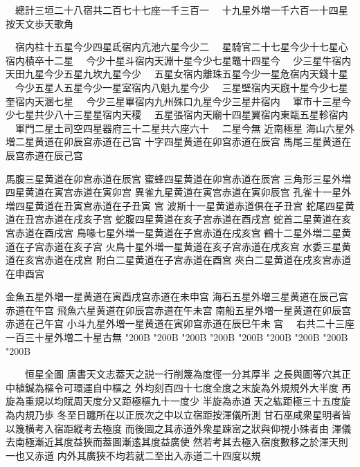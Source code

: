\begin{正文}
　總計三垣二十八宿共二百七十七座一千三百一
　十九星外増一千六百一十四星按天文歩天歌角
\par
　宿内柱十五星今少四星氐宿内亢池六星今少二
　星騎官二十七星今少十七星心宿内積卒十二星
　今少十星斗宿内天淵十星今少七星鼈十四星今
　少三星牛宿内天田九星今少五星九坎九星今少
　五星女宿内離珠五星今少一星危宿内天錢十星
　今少五星人五星今少一星室宿内八魁九星今少
　三星壁宿内天廐十星今少七星奎宿内天溷七星
　今少三星畢宿内九州殊口九星今少三星井宿内
　軍市十三星今少七星共少八十三星星宿内天稷
　五星張宿内天廟十四星翼宿内東甌五星軫宿内
　軍門二星土司空四星器府三十二星共六座六十
　二星今無
近南極星
海山六星外増二星黄道在卯辰宫赤道在己宫
十字四星黄道在卯宫赤道在辰宫
馬尾三星黄道在辰宫赤道在辰己宫
\par
馬腹三星黄道在卯宫赤道在辰宫
蜜蜂四星黄道在卯宫赤道在辰宫
三角形三星外増四星黄道在寅宫赤道在寅卯宫
異雀九星黄道在寅宫赤道在寅卯辰宫
孔雀十一星外増四星黄道在丑寅宫赤道在子丑寅
宫
波斯十一星黄道赤道俱在子丑宫
蛇尾四星黄道在丑宫赤道在戌亥子宫
蛇腹四星黄道在亥子宫赤道在酉戌宫
蛇首二星黄道在亥宫赤道在酉戌宫
鳥喙七星外増一星黄道在子宫赤道在戌亥宫
鶴十二星外増二星黄道在子宫赤道在亥子宫
火鳥十星外増一星黄道在亥子宫赤道在戌亥宫
水委三星黄道在亥宫赤道在戌宫
附白二星黄道在子宫赤道在酉宫
夾白二星黄道在戌亥宫赤道在申酉宫
\par
金魚五星外増一星黄道在寅酉戌宫赤道在未申宫
海石五星外増三星黄道在辰己宫赤道在午宫
飛魚六星黄道在卯辰宫赤道在午未宫
南船五星外増一星黄道在卯辰宫赤道在己午宫
小斗九星外増一星黄道在寅卯宫赤道在辰巳午未
宫
　右共二十三座一百三十星外増二十星古無
\char"200B\relax{}
\char"200B\relax{}
\char"200B\relax{}
\char"200B\relax{}
\char"200B\relax{}
\char"200B\relax{}
\char"200B\relax{}
\char"200B\relax{}
\char"200B\relax
\par
　　恒星全圖
唐書天文志葢天之説一行削篾為度徑一分其厚半
之長與圖等穴其正中植鍼為樞令可環運自中樞之
外均刻百四十七度全度之末旋為外規規外大半度
再旋為重規以均賦周天度分又距極樞九十一度少
半旋為赤道𢃄天之紘距極三十五度旋為内規乃歩
冬至日躔所在以正辰次之中以立宿距按渾儀所測
甘石巫咸衆星明者皆以篾横考入宿距縱考去極度
而後圖之其赤道外衆星踈宻之狀與仰視小殊者由
渾儀去南極漸近其度益狹而葢圖漸逺其度益廣使
然若考其去極入宿度數移之於渾天則一也又赤道
内外其廣狹不均若就二至出入赤道二十四度以規

\end{正文}

